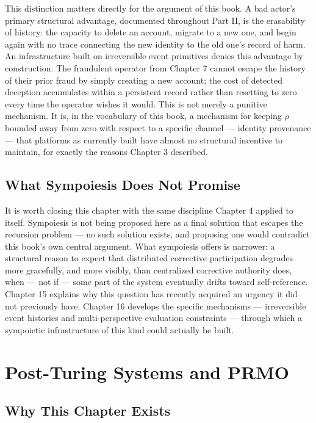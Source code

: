 \documentclass[12pt,a4paper]{book}
\begin{document}
This distinction matters directly for the argument of this book. A bad actor's primary structural advantage, documented throughout Part II, is the erasability of history: the capacity to delete an account, migrate to a new one, and begin again with no trace connecting the new identity to the old one's record of harm. An infrastructure built on irreversible event primitives denies this advantage by construction. The fraudulent operator from Chapter 7 cannot escape the history of their prior fraud by simply creating a new account; the cost of detected deception accumulates within a persistent record rather than resetting to zero every time the operator wishes it would. This is not merely a punitive mechanism. It is, in the vocabulary of this book, a mechanism for keeping $\rho$ bounded away from zero with respect to a specific channel — identity provenance — that platforms as currently built have almost no structural incentive to maintain, for exactly the reasons Chapter 3 described.

\section{What Sympoiesis Does Not Promise}

It is worth closing this chapter with the same discipline Chapter 4 applied to itself. Sympoiesis is not being proposed here as a final solution that escapes the recursion problem — no such solution exists, and proposing one would contradict this book's own central argument. What sympoiesis offers is narrower: a structural reason to expect that distributed corrective participation degrades more gracefully, and more visibly, than centralized corrective authority does, when — not if — some part of the system eventually drifts toward self-reference. Chapter 15 explains why this question has recently acquired an urgency it did not previously have. Chapter 16 develops the specific mechanisms — irreversible event histories and multi-perspective evaluation constraints — through which a sympoietic infrastructure of this kind could actually be built.


\chapter{Post-Turing Systems and PRMO}

\section{Why This Chapter Exists}
\end{document}
